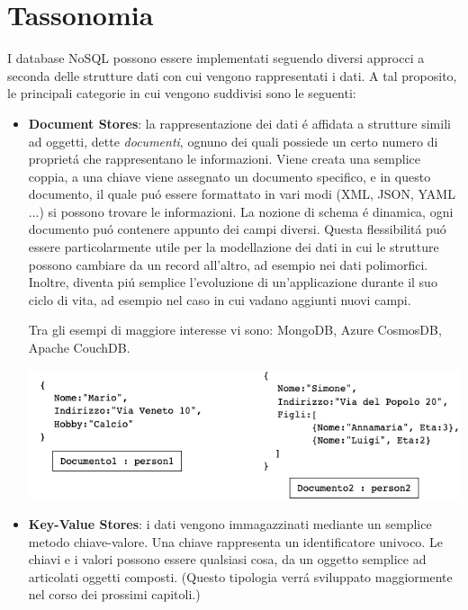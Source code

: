 \section{Tassonomia}
I database NoSQL possono essere implementati seguendo diversi approcci a seconda delle strutture dati con cui vengono
rappresentati i dati.
A tal proposito, le principali categorie in cui vengono suddivisi sono le seguenti:
\begin{itemize}
    \item \textbf{Document Stores}: la rappresentazione dei dati é affidata a strutture simili ad oggetti, dette \emph{documenti}, ognuno dei
    quali possiede un certo numero di proprietá che rappresentano le informazioni.
    Viene creata una semplice coppia, a una chiave viene assegnato un documento specifico, e in questo documento, il quale puó essere
    formattato in vari modi (XML, JSON, YAML ...) si possono trovare le informazioni.
    La nozione di schema é dinamica, ogni documento puó contenere appunto dei campi diversi. Questa flessibilitá puó essere particolarmente
    utile per la modellazione dei dati in cui le strutture possono cambiare da un record all'altro, ad esempio nei dati polimorfici.
    Inoltre, diventa piú semplice l'evoluzione di un'applicazione durante il suo ciclo di vita, ad esempio nel caso in cui vadano aggiunti nuovi
    campi.

    Tra gli esempi di maggiore interesse vi sono: MongoDB, Azure CosmosDB, Apache CouchDB.

    \includegraphics[width=1\textwidth]{img/dbDocumentale}

    \item \textbf{Key-Value Stores}: i dati vengono immagazzinati mediante un semplice metodo chiave-valore. Una chiave rappresenta un identificatore
    univoco. Le chiavi e i valori possono essere qualsiasi cosa, da un oggetto semplice ad articolati oggetti composti.
    (Questo tipologia verrá sviluppato maggiormente nel corso dei prossimi capitoli.)


\end{itemize}
